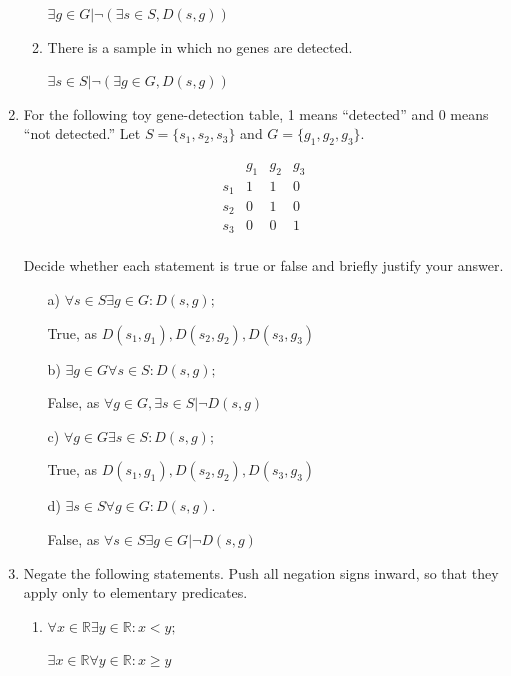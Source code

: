 \documentclass[12pt]{article}
\begin{document}
\begin{enumerate}
\begin{enumerate}
    $ \exists g \in G | \neg (\exists s \in S, D(s,g)) $

    
    \item There is a sample in which no genes are detected.

    $ \exists s\in S| \neg(\exists g \in G, D(s,g))$
\end{enumerate}


\item For the following toy gene-detection table, 1 means ``detected'' and 0 means ``not detected.'' Let \(S = \{s_1, s_2, s_3\}\) and \(G = \{g_1, g_2, g_3\}\).

\[
\begin{array}{c|ccc}
  & g_1 & g_2 & g_3 \\
\hline
s_1 & 1 & 1 & 0 \\
s_2 & 0 & 1 & 0 \\
s_3 & 0 & 0 & 1 \\
\end{array}
\]

Decide whether each statement is true or false and briefly justify your answer.

\begin{itemize}
    \item[a)] \(\forall s \in S \exists g \in G : D(s,g);\)

    True, as $D(s_1, g_1), D(s_2, g_2), D(s_3,g_3)$
    \item[b)] \(\exists g \in G \forall s \in S : D(s,g);\)
    
    False, as $\forall g\in G, \exists s \in S | \neg D(s,g)$
    
    \item[c)] \(\forall g \in G \exists s \in S : D(s,g);\)

    True, as $D(s_1, g_1), D(s_2, g_2), D(s_3,g_3)$
    
    \item[d)] \(\exists s \in S \forall g \in G : D(s,g).\)

    False, as $ \forall s \in S \exists g \in G| \neg D(s,g)$
\end{itemize}


\item Negate the following statements. Push all negation signs inward, so that they apply only to elementary predicates.
\begin{enumerate}
    \item \(\forall x \in \mathbb{R} \exists y \in \mathbb{R} : x < y;\)

    $\exists x \in \mathbb{R} \forall y \in \mathbb{R}: x \geq y$
    

\end{enumerate}
\end{enumerate}
\end{document}
